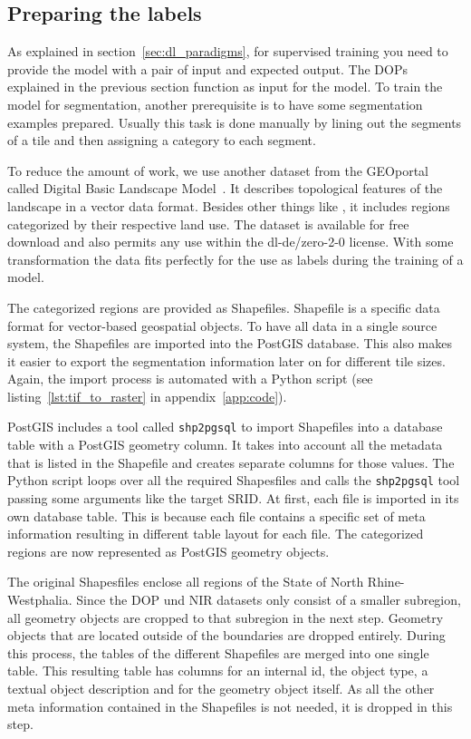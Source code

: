 \subsection{Preparing the labels}
As explained in section~\ref{sec:dl_paradigms}, for supervised training you need to provide the model with a pair of input and expected output. The DOPs explained in the previous section function as input for the model. To train the model for segmentation, another prerequisite is to have some segmentation examples prepared. Usually this task is done manually by lining out the segments of a tile and then assigning a category to each segment.

To reduce the amount of work, we use another dataset from the GEOportal called Digital Basic Landscape Model~\cite{base-dlm20}. It describes topological features of the landscape in a vector data format. Besides other things like , it includes regions categorized by their respective land use. The dataset is available for free download and also permits any use within the dl-de/zero-2-0 license. With some transformation the data fits perfectly for the use as labels during the training of a model.

The categorized regions are provided as Shapefiles. Shapefile is a specific data format for vector-based geospatial objects. To have all data in a single source system, the Shapefiles are imported into the PostGIS database. This also makes it easier to export the segmentation information later on for different tile sizes. Again, the import process is automated with a Python script (see listing~\ref{lst:tif_to_raster} in appendix~\ref{app:code}).

PostGIS includes a tool called \texttt{shp2pgsql} to import Shapefiles into a database table with a PostGIS geometry column. It takes into account all the metadata that is listed in the Shapefile and creates separate columns for those values. The Python script loops over all the required Shapesfiles and calls the \texttt{shp2pgsql} tool passing some arguments like the target SRID. At first, each file is imported in its own database table. This is because each file contains a specific set of meta information resulting in different table layout for each file. The categorized regions are now represented as PostGIS geometry objects.

The original Shapesfiles enclose all regions of the State of North Rhine-Westphalia. Since the DOP und NIR datasets only consist of a smaller subregion, all geometry objects are cropped to that subregion in the next step. Geometry objects that are located outside of the boundaries are dropped entirely. During this process, the tables of the different Shapefiles are merged into one single table. This resulting table has columns for an internal id, the object type, a textual object description and for the geometry object itself. As all the other meta information contained in the Shapefiles is not needed, it is dropped in this step.

